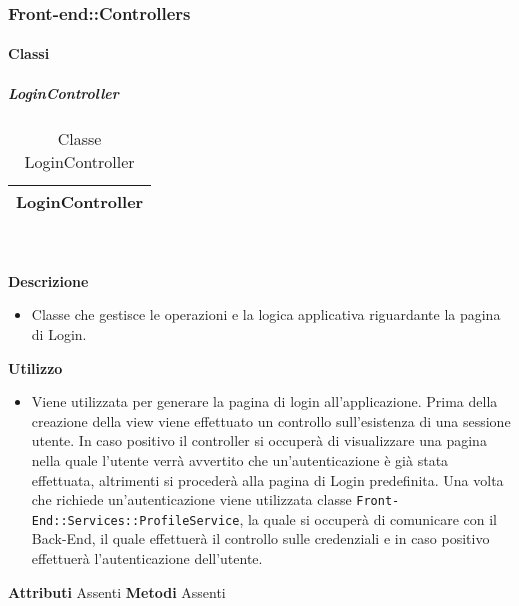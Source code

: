 

	\subsubsection{Front-end::Controllers} 
		\paragraph{Classi}
			\subparagraph{LoginController} 
\begin{table}[ht]
\begin{center}
\bgroup
	\setlength{\arrayrulewidth}{0.6mm}
	\def\arraystretch{1}
		\begin{tabular}{ | p{12cm} | }
				\hline  
					\centerline{\textbf{LoginController}}
		\\ \hline 
				\hline
				\hline
		
		\end{tabular}
\egroup
\caption{Classe LoginController}
\end{center}
\end{table} \textbf{\\ \\ Descrizione}
\begin{itemize}
\item[] Classe che gestisce le operazioni e la logica applicativa riguardante la pagina di Login.
\end{itemize} 
\textbf{Utilizzo}
\begin{itemize}
\item[] Viene utilizzata per generare la pagina di login all'applicazione. Prima della creazione della view viene effettuato un controllo sull'esistenza di una sessione utente. In caso positivo il controller si occuperà di visualizzare una pagina nella quale l'utente verrà avvertito che un'autenticazione è già stata effettuata, altrimenti si procederà alla pagina di Login predefinita. Una volta che richiede un'autenticazione viene utilizzata classe \texttt{Front-End::Services::ProfileService}, la quale si occuperà di comunicare con il Back-End, il quale effettuerà il controllo sulle credenziali e in caso positivo effettuerà l'autenticazione dell'utente.
\end{itemize}
\textbf{Attributi}
Assenti
\textbf{Metodi}
Assenti

